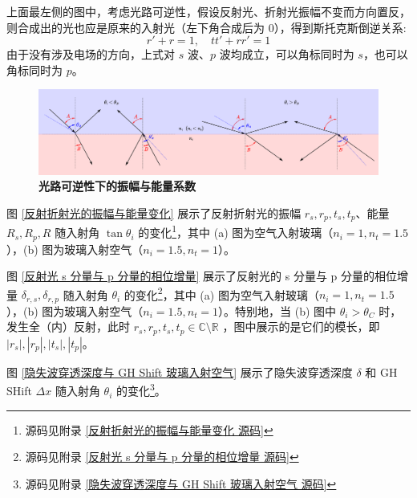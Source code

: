 \documentclass[UTF8]{report}
\def\R{\mathbb{R}}
\def\C{\mathbb{C}}
\theoremstyle{MyLineTheoremStyle} %
\theoremstyle{MyBlockTheoremStyle} %
\theoremstyle{MySubsubsectionStyle} %
\begin{document}
上面最左侧的图中，考虑光路可逆性，假设反射光、折射光振幅不变而方向置反，则合成出的光也应是原来的入射光（左下角合成后为 0），得到斯托克斯倒逆关系: 
\begin{equation}\label{斯托克斯倒逆关系}
r' + r = 1,\quad tt' + rr' = 1
\end{equation}
由于没有涉及电场的方向，上式对 $s$ 波、$p$ 波均成立，可以角标同时为 $s$，也可以角标同时为 $p$。


\begin{figure}[H]\centering
\includegraphics[width=\columnwidth]{assets/3/光路可逆性下的振幅与能量系数.pdf}
\caption{\bfseries 光路可逆性下的振幅与能量系数}\label{光路可逆性下的振幅与能量系数}
\end{figure}

图 \ref{反射折射光的振幅与能量变化} 展示了反射折射光的振幅 $r_s, r_p, t_s, t_p$、能量 $R_s, R_p, R$ 随入射角 $\tan \theta_i$ 的变化\footnote{源码见附录 \ref{反射折射光的振幅与能量变化 源码}}，其中 (a) 图为空气入射玻璃（$n_i = 1, n_t = 1.5$），(b) 图为玻璃入射空气（$n_i = 1.5, n_t = 1$）。

图 \ref{反射光 s 分量与 p 分量的相位增量} 展示了反射光的 s 分量与 p 分量的相位增量 $\delta_{r,s}, \delta_{r,p}$ 随入射角 $\theta_i$ 的变化\footnote{源码见附录 \ref{反射光 s 分量与 p 分量的相位增量 源码}}，其中 (a) 图为空气入射玻璃（$n_i = 1, n_t = 1.5$），(b) 图为玻璃入射空气（$n_i = 1.5, n_t = 1$）。特别地，当 (b) 图中 $\theta_i > \theta_C$ 时，发生全（内）反射，此时 $r_s, r_p, t_s, t_p \in \C \setminus \R$ ，图中展示的是它们的模长，即 $|r_s|, |r_p|, |t_s|, |t_p|$。

图 \ref{隐失波穿透深度与 GH Shift 玻璃入射空气} 展示了隐失波穿透深度 $\delta$ 和 GH SHift $\Delta x$ 随入射角 $\theta_i$ 的变化\footnote{源码见附录 \ref{隐失波穿透深度与 GH Shift 玻璃入射空气 源码}}。
\end{document}
